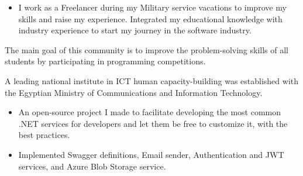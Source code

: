 \documentclass[10pt,a4paper,ragged2e,withhyper]{altacv}
\begin{document}
\begin{paracol}{2}



\divider



\begin{itemize}
\item I work as a Freelancer during my Military service vacations to improve my skills and raise my experience. Integrated my educational knowledge with industry experience to start my journey in the software industry.
\end{itemize}

\divider

The main goal of this community is to improve the problem-solving skills of all students by participating in programming competitions.

\divider

A leading national institute in ICT human capacity-building was established with the Egyptian Ministry of Communications and Information Technology.


\begin{itemize}
\item An open-source project I made to facilitate developing the most common .NET services for developers and let them be free to customize it, with the best practices.
\item Implemented Swagger definitions, Email sender, Authentication and JWT services, and Azure Blob Storage service.
\end{itemize}


\end{paracol}
\end{document}
